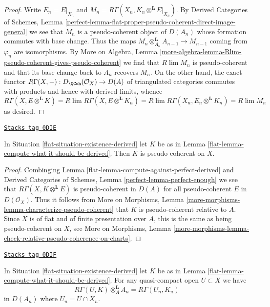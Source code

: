 \begin{proof}
Write $E_n = E|_{X_n}$ and
$M_n = R\Gamma(X_n, K_n \otimes^\mathbf{L} E|_{X_n})$.
By Derived Categories of Schemes, Lemma
\ref{perfect-lemma-flat-proper-pseudo-coherent-direct-image-general}
we see that $M_n$ is a pseudo-coherent object of $D(A_n)$
whose formation commutes with base change. Thus the maps
$M_n \otimes_{A_n}^\mathbf{L} A_{n - 1} \to M_{n - 1}$
coming from $\varphi_n$ are isomorphisms. By
More on Algebra, Lemma
\ref{more-algebra-lemma-Rlim-pseudo-coherent-gives-pseudo-coherent}
we find that $R\lim M_n$ is pseudo-coherent and
that its base change back to $A_n$ recovers $M_n$.
On the other hand, the exact functor
$R\Gamma(X, -) : D_\QCoh(\mathcal{O}_X) \to D(A)$
of triangulated categories commutes with products
and hence with derived limits, whence
$$
R\Gamma(X, E \otimes^\mathbf{L} K) =
R\lim R\Gamma(X,  E \otimes^\mathbf{L} K_n) =
R\lim R\Gamma(X_n, E_n \otimes^\mathbf{L} K_n) =
R\lim M_n
$$
as desired.
\end{proof}

\begin{lemma}
\label{flat-lemma-relative-pseudo-coherence-derived}
\href{https://stacks.math.columbia.edu/tag/0DIE}{\texttt{Stacks tag 0DIE}}

In Situation \ref{flat-situation-existence-derived} let $K$ be as in
Lemma \ref{flat-lemma-compute-what-it-should-be-derived}. Then $K$
is pseudo-coherent on $X$.
\end{lemma}

\begin{proof}

Combinging Lemma \ref{flat-lemma-compute-against-perfect-derived} and
Derived Categories of Schemes, Lemma
\ref{perfect-lemma-perfect-enough}
we see that $R\Gamma(X, K \otimes^\mathbf{L} E)$
is pseudo-coherent in $D(A)$ for all pseudo-coherent
$E$ in $D(\mathcal{O}_X)$. Thus it follows from
More on Morphisms, Lemma
\ref{more-morphisms-lemma-characterize-pseudo-coherent}
that $K$ is pseudo-coherent relative to $A$.
Since $X$ is of flat and of finite presentation
over $A$, this is the same as being pseudo-coherent on $X$, see
More on Morphisms, Lemma
\ref{more-morphisms-lemma-check-relative-pseudo-coherence-on-charts}.
\end{proof}

\begin{lemma}
\label{flat-lemma-compute-over-affine-derived}
\href{https://stacks.math.columbia.edu/tag/0DIF}{\texttt{Stacks tag 0DIF}}

In Situation \ref{flat-situation-existence-derived} let $K$ be as in
Lemma \ref{flat-lemma-compute-what-it-should-be-derived}. For any quasi-compact
open $U \subset X$ we have
$$
R\Gamma(U, K) \otimes_A^\mathbf{L} A_n =
R\Gamma(U_n, K_n)
$$
in $D(A_n)$ where $U_n = U \cap X_n$.
\end{lemma}


